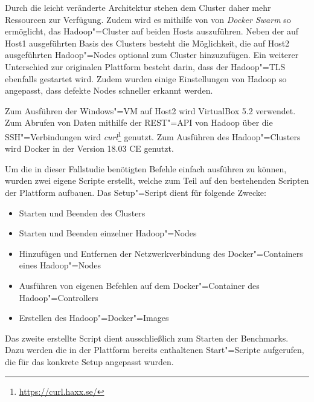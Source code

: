 Durch die leicht veränderte Architektur stehen dem Cluster daher mehr Ressourcen zur Verfügung.
Zudem wird es mithilfe von von \emph{Docker Swarm} so ermöglicht, das Hadoop"=Cluster auf beiden Hosts auszuführen.
Neben der auf Host1 ausgeführten Basis des Clusters besteht die Möglichkeit, die auf Host2 ausgeführten Hadoop"=Nodes optional zum Cluster hinzuzufügen.
Ein weiterer Unterschied zur originalen Plattform besteht darin, dass der Hadoop"=\ac{TLS} ebenfalls gestartet wird.
Zudem wurden einige Einstellungen von Hadoop so angepasst, dass defekte Nodes schneller erkannt werden.

Zum Ausführen der Windows"=VM auf Host2 wird VirtualBox 5.2 verwendet.
Zum Abrufen von Daten mithilfe der REST"=API von Hadoop über die SSH"=Verbindungen wird \emph{curl}\footnote{\url{https://curl.haxx.se/}} genutzt.
Zum Ausführen des Hadoop"=Clusters wird Docker in der Version 18.03 CE genutzt.

Um die in dieser Fallstudie benötigten Befehle einfach ausführen zu können, wurden zwei eigene Scripte erstellt, welche zum Teil auf den bestehenden Scripten der Plattform aufbauen.
Das Setup"=Script dient für folgende Zwecke:

\begin{itemize}
    \item Starten und Beenden des Clusters
    \item Starten und Beenden einzelner Hadoop"=Nodes
    \item Hinzufügen und Entfernen der Netzwerkverbindung des Docker"=Containers eines Hadoop"=Nodes
    \item Ausführen von eigenen Befehlen auf dem Docker"=Container des Hadoop"=Controllers
    \item Erstellen des Hadoop"=Docker"=Images
\end{itemize}

Das zweite erstellte Script dient ausschließlich zum Starten der Benchmarks.
Dazu werden die in der Plattform bereits enthaltenen Start"=Scripte aufgerufen, die für das konkrete Setup angepasst wurden.
